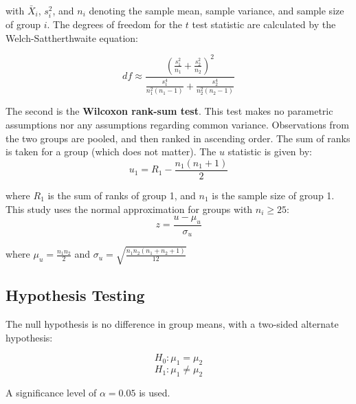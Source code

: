 \documentclass{report}
\begin{document}
with $\bar{X}_i$, $s^2_i$, and $n_i$ denoting the sample mean, sample variance, and
sample size of group $i$. The degrees of freedom for the $t$ test statistic are
calculated by the Welch-Sattherthwaite equation:

\begin{equation}
	df \approx \frac{\left(\frac{s^2_1}{n_1} + \frac{s^2_2}{n_2}
	\right)^2}{\frac{s^4_1}{n^2_1(n_1 - 1)} + \frac{s^4_2}{n^2_2(n_2 - 1)}}
\end{equation}

The second is the \textbf{Wilcoxon rank-sum test}. This test makes no parametric
assumptions nor any assumptions regarding common variance. Observations from the
two groups are pooled, and then ranked in ascending order. The sum of ranks is
taken for a group (which does not matter). The $u$ statistic is given by:
\begin{equation}
	u_1 = R_1 - \frac{n_1(n_1 + 1)}{2} 
\end{equation}

where $R_1$ is the sum of ranks of group 1, and $n_1$ is the sample size of
group 1. This study uses the normal approximation for groups with $n_i\geq25$:
\begin{equation}
	z = \frac{u - \mu_u}{\sigma_u}
\end{equation}

where $\mu_u = \frac{n_1n_2}{2}$ and $\sigma_u =
\sqrt{\frac{n_1n_2(n_1+n_2+1)}{12}}$

\subsection*{Hypothesis Testing}

The null hypothesis is no difference in group means, with a two-sided alternate
hypothesis:

$$
H_0: \mu_1 = \mu_2
$$
$$
H_1: \mu_1 \neq \mu_2
$$

A significance level of $\alpha = 0.05$ is used.

%
%
\end{document}
